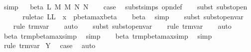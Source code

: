 \begin{isabellebody}
\ simp\isanewline
\ \isamarkupfalse%
\isanewline
{}\isamarkupfalse%
\ {\isacharparenleft}beta\ L\ M\ M{\isacharprime}\ N\ N{\isacharprime}{\isacharparenright}\isanewline
\ \ \isamarkupfalse%
\ {\isacharquery}case\ \isamarkupfalse%
\ subst{\isachardot}simps\ opn{\isacharprime}{\isacharunderscore}def\isanewline
\ \ \isamarkupfalse%
\ {\isacharparenleft}subst\ subst{\isacharunderscore}open{\isacharparenright}\isanewline
\ \ \isamarkupfalse%
\isanewline
\ \ \isamarkupfalse%
\ {\isacharparenleft}rule{\isacharunderscore}tac\ L{\isacharequal}{\isachardoublequoteopen}L\ {\isasymunion}\ {\isacharbraceleft}x{\isacharbraceright}{\isachardoublequoteclose}\ \ pbeta{\isacharunderscore}max{\isacharunderscore}beta{\isacharprime}{\isacharparenright}\isanewline
\ \ \isamarkupfalse%
\ beta\ \isamarkupfalse%
\ simp\isanewline
\ \ \isamarkupfalse%
\ {\isacharparenleft}subst\ subst{\isacharunderscore}open{\isacharunderscore}var{}{\isacharparenright}\isanewline
\ \ \isamarkupfalse%
\ {\isacharparenleft}rule\ trm{\isachardot}var{\isacharparenright}\isanewline
\ \ \isamarkupfalse%
\ auto{\isacharbrackleft}{}{\isacharbrackright}\isanewline
\ \ \isamarkupfalse%
\ {\isacharparenleft}subst\ subst{\isacharunderscore}open{\isacharunderscore}var{}{\isacharparenright}\isanewline
\ \ \isamarkupfalse%
\ {\isacharparenleft}rule\ trm{\isachardot}var{\isacharparenright}\isanewline
\ \ \isamarkupfalse%
\ auto{\isacharbrackleft}{}{\isacharbrackright}\isanewline
\ \ \isamarkupfalse%
\ beta\ trm{\isacharunderscore}pbeta{\isacharunderscore}max{\isacharunderscore}simp{}\ \isamarkupfalse%
\ simp\isanewline
\ \ \isamarkupfalse%
\ beta\ trm{\isacharunderscore}pbeta{\isacharunderscore}max{\isacharunderscore}simp{}\ \isamarkupfalse%
\ simp\isanewline
\ \ \isamarkupfalse%
\ {\isacharparenleft}rule\ trm{\isachardot}var{\isacharparenright}\isanewline
{}\isamarkupfalse%
\isanewline
{}\isamarkupfalse%
\ Y\ \isamarkupfalse%
\ {\isacharquery}case\ \isamarkupfalse%
\ auto\isanewline
{}\isamarkupfalse%
%
\endisatagproof
{\isafoldproof}%
%
\isadelimproof
\isanewline
%
\endisadelimproof
\isanewline
{}\isamarkupfalse%

\end{isabellebody}
